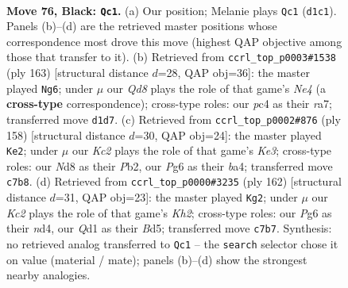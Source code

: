 \documentclass[11pt]{article}
\begin{document}
\clearpage

\begin{figure}[p]\centering
\begin{subfigure}{0.46\textwidth}\centering
\resizebox{\linewidth}{!}{%
\newchessgame
\chessboard[
  setfen={3n4/2k3p1/1p4p1/p1p5/2P5/1P6/K7/3q4 b - - 1 76},
  showmover=false,
  pgfstyle=straightmove, color=movearrow, markmove={d1-c1}
]}
\caption{}
\end{subfigure}\hfill
\begin{subfigure}{0.46\textwidth}\centering
\resizebox{\linewidth}{!}{%
\newchessgame
\chessboard[
  setfen={8/R7/4pk2/3pn1p1/6P1/5P2/5K2/8 b - - 19 82},
  showmover=false,
  pgfstyle=straightmove, color=movearrow, markmove={e5-g6}
]}
\caption{}
\end{subfigure}
\\[4pt]
\begin{subfigure}{0.46\textwidth}\centering
\resizebox{\linewidth}{!}{%
\newchessgame
\chessboard[
  setfen={3B4/1p6/5pk1/6p1/b3P1P1/4KP2/1P6/8 w - - 22 80},
  showmover=false,
  pgfstyle=straightmove, color=movearrow, markmove={e3-e2}
]}
\caption{}
\end{subfigure}\hfill
\begin{subfigure}{0.46\textwidth}\centering
\resizebox{\linewidth}{!}{%
\newchessgame
\chessboard[
  setfen={5k2/5p2/6pp/3B4/3n3P/6P1/5P1K/8 w - - 1 82},
  showmover=false,
  pgfstyle=straightmove, color=movearrow, markmove={h2-g2}
]}
\caption{}
\end{subfigure}
\caption{\textbf{Move 76, Black: \texttt{Qc1}.} (a) Our position; Melanie plays \texttt{Qc1} (\texttt{d1c1}). Panels (b)--(d) are the retrieved master positions whose correspondence most drove this move (highest QAP objective among those that transfer to it). (b) Retrieved from \texttt{ccrl\_top\_p0003\#1538} (ply 163) [structural distance $d$=28, QAP obj=36]: the master played \texttt{Ng6}; under $\mu$ our \emph{Qd8} plays the role of that game's \emph{Ne4} (a \textbf{cross-type} correspondence); cross-type roles: our \emph{p}c4 as their \emph{r}a7; transferred move \texttt{d1d7}. (c) Retrieved from \texttt{ccrl\_top\_p0002\#876} (ply 158) [structural distance $d$=30, QAP obj=24]: the master played \texttt{Ke2}; under $\mu$ our \emph{Kc2} plays the role of that game's \emph{Ke3}; cross-type roles: our \emph{N}d8 as their \emph{P}b2, our \emph{P}g6 as their \emph{b}a4; transferred move \texttt{c7b8}. (d) Retrieved from \texttt{ccrl\_top\_p0000\#3235} (ply 162) [structural distance $d$=31, QAP obj=23]: the master played \texttt{Kg2}; under $\mu$ our \emph{Kc2} plays the role of that game's \emph{Kh2}; cross-type roles: our \emph{P}g6 as their \emph{n}d4, our \emph{Q}d1 as their \emph{B}d5; transferred move \texttt{c7b7}. Synthesis: no retrieved analog transferred to \texttt{Qc1} -- the \texttt{search} selector chose it on value (material / mate); panels (b)--(d) show the strongest nearby analogies.}
\label{fig:thought-m151}
\end{figure}
\end{document}
